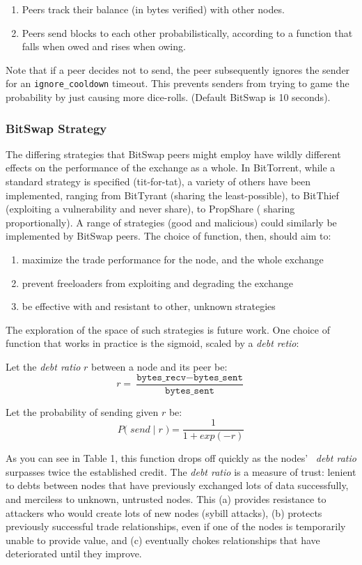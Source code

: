 \documentclass{sig-alternate}
\begin{document}
\begin{enumerate}
  \item Peers track their balance (in bytes verified) with other nodes.
  \item Peers send blocks to each other probabilistically, according to
        a function that falls when owed and rises when owing.
\end{enumerate}

Note that if a peer decides not to send, the peer subsequently ignores the
sender for an \texttt{ignore\_cooldown} timeout. This prevents senders
from trying to game the probability by just causing more dice-rolls.
(Default BitSwap is 10 seconds).

\subsubsection{BitSwap Strategy}

The differing strategies that BitSwap peers might employ have wildly different
effects on the performance of the exchange as a whole. In BitTorrent,
while a standard strategy is specified (tit-for-tat), a variety of others have
been implemented, ranging from BitTyrant (sharing the least-possible),
to BitThief (exploiting a vulnerability and never share), to PropShare (
sharing proportionally). A range of strategies (good and malicious) could
similarly be implemented by BitSwap peers. The choice of function, then, should
aim to:

\begin{enumerate}
  \item maximize the trade performance for the node, and the whole exchange
  \item prevent freeloaders from exploiting and degrading the exchange
  \item be effective with and resistant to other, unknown strategies
\end{enumerate}

The exploration of the space of such strategies is future work.
One choice of function that works in practice is the sigmoid, scaled by a
\textit{debt retio}:

Let the \textit{debt ratio} $ r $ between a node and its peer be:
  \[ r = \dfrac{\texttt{bytes\_recv} - \texttt{bytes\_sent}}{\texttt{bytes\_sent}} \]

Let the probability of sending given $r$ be:
  \[ P\Big( \; send \; | \; r \;\Big) = \dfrac{1}{1 + exp(-r)} \]

As you can see in Table 1, this function drops off quickly as the nodes' \
\textit{debt ratio} surpasses twice the established credit.
The \textit{debt ratio} is a measure of trust:
lenient to debts between nodes that have previously exchanged lots of data
successfully, and merciless to unknown, untrusted nodes. This
(a) provides resistance to attackers who would create lots of new nodes
(sybill attacks),
(b) protects previously successful trade relationships, even if one of the
nodes is temporarily unable to provide value, and
(c) eventually chokes relationships that have deteriorated until they
improve.
\end{document}
